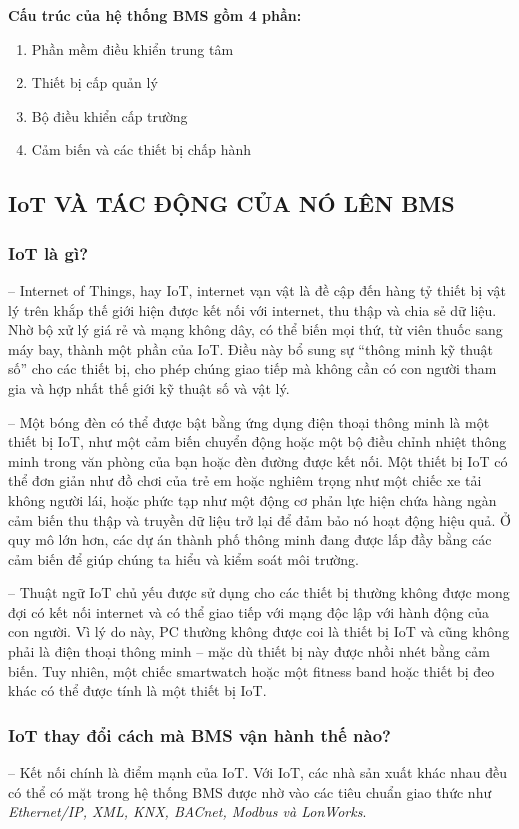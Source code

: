 	\textbf{Cấu trúc của hệ thống BMS gồm 4 phần:}
	\begin{enumerate}
		\item Phần mềm điều khiển trung tâm
		\item Thiết bị cấp quản lý
		\item Bộ điều khiển cấp trường
		\item Cảm biến và các thiết bị chấp hành
	\end{enumerate}

	\subsection{IoT VÀ TÁC ĐỘNG CỦA NÓ LÊN BMS}
	\subsubsection{IoT là gì?}
	-- Internet of Things, hay IoT, internet vạn vật là đề cập đến hàng tỷ thiết bị vật lý trên khắp thế giới hiện được kết nối với internet, thu thập và chia sẻ dữ liệu. Nhờ bộ xử lý giá rẻ và mạng không dây, có thể biến mọi thứ, từ viên thuốc sang máy bay, thành một phần của IoT. Điều này bổ sung sự “thông minh kỹ thuật số” cho các thiết bị, cho phép chúng giao tiếp mà không cần có con người tham gia và hợp nhất thế giới kỹ thuật số và vật lý.

	-- Một bóng đèn có thể được bật bằng ứng dụng điện thoại thông minh là một thiết bị IoT, như một cảm biến chuyển động hoặc một bộ điều chỉnh nhiệt thông minh trong văn phòng của bạn hoặc đèn đường được kết nối. Một thiết bị IoT có thể đơn giản như đồ chơi của trẻ em hoặc nghiêm trọng như một chiếc xe tải không người lái, hoặc phức tạp như một động cơ phản lực hiện chứa hàng ngàn cảm biến thu thập và truyền dữ liệu trở lại để đảm bảo nó hoạt động hiệu quả. Ở quy mô lớn hơn, các dự án thành phố thông minh đang được lấp đầy bằng các cảm biến để giúp chúng ta hiểu và kiểm soát môi trường.

	-- Thuật ngữ IoT chủ yếu được sử dụng cho các thiết bị thường không được mong đợi có kết nối internet và có thể giao tiếp với mạng độc lập với hành động của con người. Vì lý do này, PC thường không được coi là thiết bị IoT và cũng không phải là điện thoại thông minh – mặc dù thiết bị này được nhồi nhét bằng cảm biến. Tuy nhiên, một chiếc smartwatch hoặc một fitness band hoặc thiết bị đeo khác có thể được tính là một thiết bị IoT.
	
	\subsubsection{IoT thay đổi cách mà BMS vận hành thế nào?}
	-- Kết nối chính là điểm mạnh của IoT. Với IoT, các nhà sản xuất khác nhau đều có thể có mặt trong hệ thống BMS được nhờ vào các tiêu chuẩn giao thức như \emph{Ethernet/IP, XML, KNX, BACnet, Modbus và LonWorks}. 


